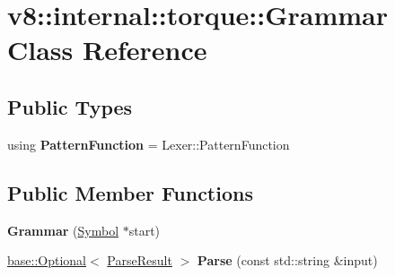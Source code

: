 \hypertarget{classv8_1_1internal_1_1torque_1_1Grammar}{}\section{v8\+:\+:internal\+:\+:torque\+:\+:Grammar Class Reference}
\label{classv8_1_1internal_1_1torque_1_1Grammar}
\subsection*{Public Types}
\begin{DoxyCompactItemize}
\item 
\mbox{\label{classv8_1_1internal_1_1torque_1_1Grammar_a1598ba4a21ce1f3a3165a764422ca755}} 
using {\bfseries Pattern\+Function} = Lexer\+::\+Pattern\+Function
\end{DoxyCompactItemize}
\subsection*{Public Member Functions}
\begin{DoxyCompactItemize}
\item 
\mbox{\label{classv8_1_1internal_1_1torque_1_1Grammar_a3e2e65d0801eeea499c4afd29f37e600}} 
{\bfseries Grammar} (\mbox{\hyperlink{classv8_1_1internal_1_1torque_1_1Symbol}{Symbol}} $\ast$start)
\item 
\mbox{\label{classv8_1_1internal_1_1torque_1_1Grammar_ab59e3e448a25a5c389c2162e60a57766}} 
\mbox{\hyperlink{classv8_1_1base_1_1Optional}{base\+::\+Optional}}$<$ \mbox{\hyperlink{classv8_1_1internal_1_1torque_1_1ParseResult}{Parse\+Result}} $>$ {\bfseries Parse} (const std\+::string \&input)
\end{DoxyCompactItemize}
